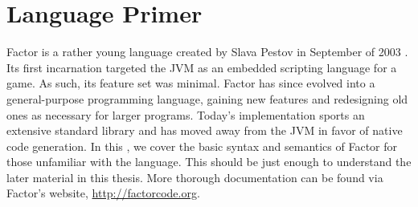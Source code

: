 \chapter{Language Primer}\label{sec:primer}

Factor is a rather young language created by Slava Pestov in September of 2003
\autocite{young-factor}.  Its first incarnation targeted the \gls{JVM} as an
embedded scripting language for a game.  As such, its feature set was minimal.
Factor has since evolved into a general-purpose programming language, gaining
new features and redesigning old ones as necessary for larger programs.
Today's implementation sports an extensive standard library and has moved away
from the \gls{JVM} in favor of native code generation.  In this
, we cover the basic syntax and semantics of Factor for
those unfamiliar with the language.  This should be just enough to understand
the later material in this thesis.  More thorough documentation can be found
via Factor's website, \url{http://factorcode.org}.






